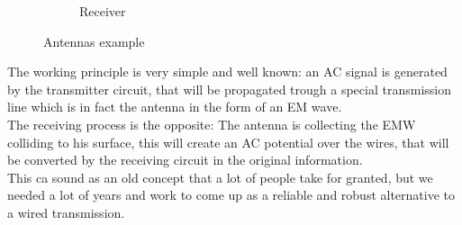 \begin{figure}[H]
\begin{subfigure}[b]{0.45\textwidth}
{ }   
        \caption{Receiver}
    \end{subfigure}\caption{Antennas example}\label{fig:antennas_example}
    \end{figure}
The working principle is very simple and well known: an AC signal is generated by the transmitter circuit, that will be propagated trough a special transmission line which is in fact the antenna in the form of an EM wave.\\
The receiving process is the opposite: The antenna is collecting the EMW colliding to his surface, this will create an AC potential over the wires, that will be converted by the receiving circuit in the original information.\\
This ca sound as an old concept that a lot of people take for granted, but we needed a lot of years and work to come up as a reliable and robust alternative to a wired transmission.
